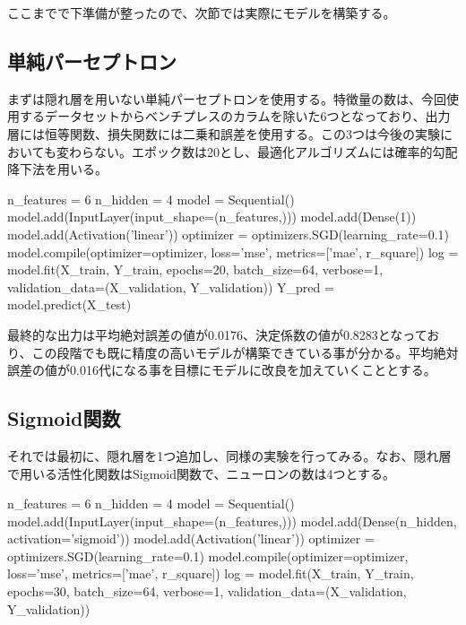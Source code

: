 \documentclass{article}
\begin{document}
ここまでで下準備が整ったので、次節では実際にモデルを構築する。

\subsection{単純パーセプトロン}

まずは隠れ層を用いない単純パーセプトロンを使用する。特徴量の数は、今回使用するデータセットからベンチプレスのカラムを除いた6つとなっており、出力層には恒等関数、損失関数には二乗和誤差を使用する。この3つは今後の実験においても変わらない。エポック数は20とし、最適化アルゴリズムには確率的勾配降下法を用いる。
\\

\begin{python}
n_features = 6
n_hidden   = 4
model = Sequential()
model.add(InputLayer(input_shape=(n_features,)))
model.add(Dense(1))
model.add(Activation('linear'))
optimizer = optimizers.SGD(learning_rate=0.1)
model.compile(optimizer=optimizer,
              loss='mse', metrics=['mae', r_square])
log = model.fit(X_train, Y_train, epochs=20, batch_size=64, 
verbose=1,
         validation_data=(X_validation, Y_validation))
Y_pred = model.predict(X_test)
\end{python}

最終的な出力は平均絶対誤差の値が0.0176、決定係数の値が0.8283となっており、この段階でも既に精度の高いモデルが構築できている事が分かる。平均絶対誤差の値が0.016代になる事を目標にモデルに改良を加えていくこととする。

\subsection{Sigmoid関数}

それでは最初に、隠れ層を1つ追加し、同様の実験を行ってみる。なお、隠れ層で用いる活性化関数はSigmoid関数で、ニューロンの数は4つとする。
\\

\begin{python}
n_features = 6
n_hidden   = 4
model = Sequential()
model.add(InputLayer(input_shape=(n_features,)))
model.add(Dense(n_hidden, activation='sigmoid'))
model.add(Activation('linear'))
optimizer = optimizers.SGD(learning_rate=0.1)
model.compile(optimizer=optimizer,
              loss='mse', metrics=['mae', r_square])
log = model.fit(X_train, Y_train, epochs=30, batch_size=64, 
verbose=1,
         validation_data=(X_validation, Y_validation))
\end{python}
\end{document}
